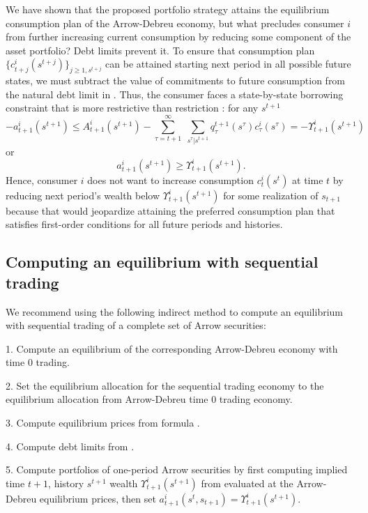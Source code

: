 We have shown that the proposed portfolio strategy attains the equilibrium
consumption plan
 of the Arrow-Debreu economy, but what
precludes consumer $i$ from further increasing current consumption by
reducing some component of the asset portfolio? Debt limits prevent it.  
 To ensure that consumption plan
$\{c^i_{t+j}(s^{t+j})\}_{j\geq 1,s^{t+j}}$
can be attained starting next period in all possible future states,
we must subtract the value of commitments to future
consumption
from the natural debt limit in .
 Thus, the consumer faces a
state-by-state borrowing constraint that is more
 restrictive than restriction :
for any $s^{t+1}$
$$  - a^i_{t+1}(s^{t+1}) \leq  A^i_{t+1}(s^{t+1} )
- \sum_{\tau=t+1}^\infty \; \sum_{s^\tau \vert s^{t+1}}
  q_\tau^{t+1}(s^\tau) c^i_\tau(s^\tau)
  = - \Upsilon^i_{t+1}(s^{t+1})$$
or
$$   a^i_{t+1}(s^{t+1})  \geq  \Upsilon^i_{t+1}(s^{t+1}). $$
Hence, consumer $i$ does not want to increase consumption 
$c^i_t(s^t)$ at time $t$ by
reducing next period's wealth below $\Upsilon^i_{t+1}(s^{t+1})$
for some realization of $s_{t+1}$ because
that would jeopardize attaining the preferred consumption plan
that satisfies first-order conditions  for all future periods and
histories.


\subsection{Computing an equilibrium with sequential
            trading}\label{sec:example4cont}%
We  recommend using the following indirect method to compute 
an equilibrium  with sequential trading of a complete set of Arrow securities:

\medskip
\item {1.}  Compute an equilibrium of the corresponding  Arrow-Debreu economy with time $0$ trading.
\medskip
\item {2.} Set the equilibrium allocation for the sequential trading economy to  the equilibrium allocation from Arrow-Debreu
time $0$ trading economy.
\medskip
\item {3.} Compute equilibrium prices from formula .
\medskip
\item{4.} Compute debt limits from .
\medskip
\item {5.}  Compute portfolios of one-period Arrow securities  by first computing implied time $t+1$, history $s^{t+1}$
wealth $\Upsilon^i_{t+1}(s^{t+1}) $ from  evaluated at the Arrow-Debreu equilibrium prices,
then set $a^i_{t+1}(s^t,s_{t+1}) 
          = \Upsilon^i_{t+1}(s^{t+1})$.

